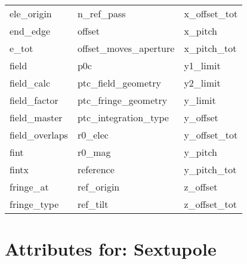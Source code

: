 \begin{tabular}{lll}
ele_origin                  & n_ref_pass                  & x_offset_tot                \\
end_edge                    & offset                      & x_pitch                     \\
e_tot                       & offset_moves_aperture       & x_pitch_tot                 \\
field                       & p0c                         & y1_limit                    \\
field_calc                  & ptc_field_geometry          & y2_limit                    \\
field_factor                & ptc_fringe_geometry         & y_limit                     \\
field_master                & ptc_integration_type        & y_offset                    \\
field_overlaps              & r0_elec                     & y_offset_tot                \\
fint                        & r0_mag                      & y_pitch                     \\
fintx                       & reference                   & y_pitch_tot                 \\
fringe_at                   & ref_origin                  & z_offset                    \\
fringe_type                 & ref_tilt                    & z_offset_tot                \\
 \bottomrule
 \end{tabular}
 \vfill
 
 \section{Attributes for: Sextupole}
 \label{s:list.sextupole}
 
